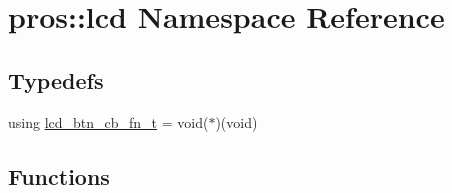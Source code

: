 \hypertarget{namespacepros_1_1lcd}{}\section{pros\+::lcd Namespace Reference}
\label{namespacepros_1_1lcd}
\subsection*{Typedefs}
\begin{DoxyCompactItemize}
\item 
using \mbox{\hyperlink{namespacepros_1_1lcd_ab5c0cdcf37795ff2a9dcaf546b087dd4}{lcd\+\_\+btn\+\_\+cb\+\_\+fn\+\_\+t}} = void($\ast$)(void)
\end{DoxyCompactItemize}
\subsection*{Functions}
